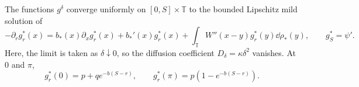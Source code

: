 \documentclass[11pt,reqno]{amsart}
\numberwithin{equation}{section}
\theoremstyle{plain}
\theoremstyle{remark}
\newcommand{\T}{\mathbb T}\newcommand{\R}{\mathbb R}\newcommand{\Z}{\mathbb Z}
\begin{document}
\begin{lemma}\label{ce:lem:adjointlimit}
The functions $g^\delta$ converge uniformly on $[0,S]\times\T$ to the bounded Lipschitz mild solution of
\begin{equation}\label{ce:eq:limiting-gradient-adjoint}
 -\partial_r g^*_r(x)=b_*(x)\partial_xg^*_r(x)+b_*'(x)g^*_r(x)
 +\int_\T W''(x-y)g^*_r(y)\dd\rho_*(y),\qquad g^*_S=\psi'.
\end{equation}
Here, the limit is taken as $\delta\downarrow0$, so the diffusion coefficient $D_\delta=\kappa\delta^2$ vanishes. At $0$ and $\pi$, 
\begin{equation}\label{ce:eq:gradcenters}
 g^*_r(0)=p+q e^{-b(S-r)},\qquad
 g^*_r(\pi)=p(1-e^{-b(S-r)}).
\end{equation}
\end{lemma}
\end{document}
